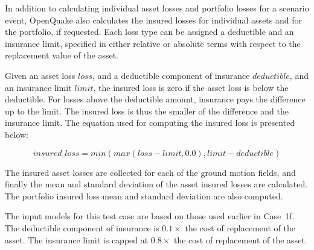 In addition to calculating individual asset losses and portfolio losses for a scenario event, OpenQuake also calculates the insured losses for individual assets and for the portfolio, if requested. Each loss type can be assigned a deductible and an insurance limit, specified in either relative or absolute terms with respect to the replacement value of the asset.

Given an asset loss $loss$, and a deductible component of insurance $deductible$, and an insurance limit $limit$, the insured loss is zero if the asset loss is below the deductible. For losses above the deductible amount, insurance pays the difference up to the limit. The insured loss is thus the smaller of the difference and the insurance limit. The equation used for computing the insured loss is presented below:

\begin{equation}
	insured\_loss = min(max(loss - limit, 0.0), limit - deductible)
\end{equation}

The insured asset losses are collected for each of the ground motion fields, and finally the mean and standard deviation of the asset insured losses are calculated. The portfolio insured loss mean and standard deviation are also computed.

The input models for this test case are based on those used earlier in Case~1f. The deductible component of insurance is $0.1\times$ the cost of replacement of the asset. The insurance limit is capped at $0.8\times$ the cost of replacement of the asset.